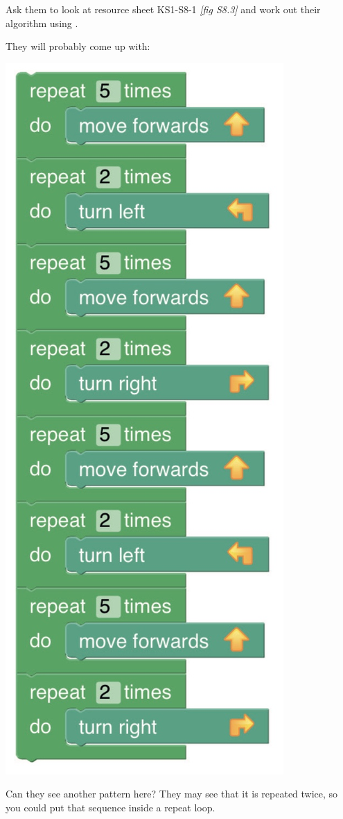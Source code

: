 \documentclass{../../../lessonplan}
\begin{document}
\begin{lessonplan}
Ask them to look at resource sheet KS1-S8-1 \textit{[fig S8.3]} and work out their algorithm using .


They will probably come up with:

\begin{center}
\includegraphics[width=.667\linewidth]{example1.jpg}
\end{center}

Can they see another  pattern here?
They may see that it is repeated twice, so you could put that sequence inside a repeat loop.


\end{lessonplan}
\end{document}
